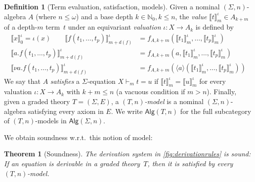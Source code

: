 \documentclass[11pt,a4paper]{amsart}
\newtheorem{theorem}{Theorem}[section]
\newcommand{\Alg}{\mathsf{Alg}}
\theoremstyle{plain}
\numberwithin{equation}{section}
\newcommand{\Nat}{{\mathbb{N}}}
\newcommand{\+}[1]{\mathcal{#1}\xspace}
\theoremstyle{definition}
\newtheorem{defn}[defn]{Definition}
\begin{document}
\begin{defn}[Term evaluation, satisfaction, models]
  Given a nominal \((\Sigma, n)\)-algebra \(A\) (where $n\le\omega$)
  and a base depth \(k \in \Nat_0, k \le n\), the \emph{value}
  \(\llbracket t \rrbracket^\iota_m\in A_{k + m}\) of a depth-$m$
  term~$t$ under an equivariant \emph{valuation}
  \(\iota\colon X \to A_k\) is defined by
  \begin{align*}
    \llbracket x \rrbracket^\iota_0  = \iota(x) \qquad
    \llbracket f(t_1, \ldots, t_p) \rrbracket^\iota_{m + d(f)}  &= f_{A,
      k + m}(\llbracket t_1 \rrbracket^\iota_m, \ldots, \llbracket t_p
    \rrbracket^\iota_m)\\
    \llbracket a.f(t_1, \ldots, t_p) \rrbracket^\iota_{m + d(f)} &=
    f_{A, k + m}(a, \llbracket t_1 \rrbracket^\iota_m, \ldots,
    \llbracket t_p \rrbracket^\iota_m) \\
    \llbracket \nu a.f(t_1,
    \ldots, t_p) \rrbracket^\iota_{m + d(f)}  &= f_{A, k + m}(\langle a
    \rangle (\llbracket t_1 \rrbracket^\iota_m, \ldots, \llbracket t_p
    \rrbracket^\iota_m))
  \end{align*}
  We say that \(A\) \emph{satisfies} a $\Sigma$-equation
  \(X \vdash_m t = u\) if
  \(\llbracket t \rrbracket^\iota_m = \llbracket u
  \rrbracket^\iota_m\) for every valuation \(\iota\colon X \to A_k\)
  with \(k + m \le n\) (a vacuous condition if $m>n$). Finally, given
  a graded theory \(T = (\Sigma, E)\), a \emph{\((T, n)\)-model} is a
  nominal \((\Sigma, n)\)-algebra satisfying every axiom in \(E\).  We
  write \(\Alg(T, n)\) for the full subcategory of \((T, n)\)-models
  in \(\Alg(\Sigma, n)\).
\end{defn}
\noindent %



\noindent We obtain soundness w.r.t.~this notion of model:


\begin{theorem}[Soundness]\label{thm:soundness}
  The derivation system in \cref{fig:derivationrules} is sound: If
  an equation is derivable in a graded theory~$T$, then it is
  satisfied by every \((T, n)\)-model.
\end{theorem}


\end{document}

